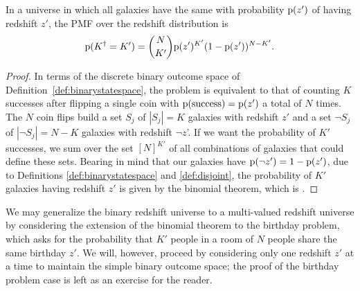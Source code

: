 \begin{lemma}\label{lem:identical}
	In a universe in which all galaxies have the same \pzpdf with probability $\mathrm{p}(z')$ of having redshift $z'$, the PMF over the redshift distribution is
	\begin{equation}
	\eqlabel{eqn:binomial}
	\pr{K^{\dagger} = K'} = \binom{N}{K'} \pr{z'}^{K'} (1 - \pr{z'})^{N - K'} .
	\end{equation}
\end{lemma}
\begin{proof}
In terms of the discrete binary outcome space of Definition~\ref{def:binarystatespace}, the problem is equivalent to that of counting $K$ successes after flipping a single coin with $\mathrm{p}(\mathrm{success}) = \mathrm{p}(z')$ a total of $N$ times.
The $N$ coin flips build a set $S_{j}$ of ${|S_{j}| = K}$ galaxies with redshift $z'$ and a set $\lnot S_{j}$ of ${|\lnot S_{j}| = N - K}$ galaxies with redshift $\lnot z$'.
If we want the probability of $K'$ successes, we sum over the set $[N]^{K'}$ of all combinations of galaxies that could define these sets.
Bearing in mind that our galaxies have ${\mathrm{p}(\lnot z') = 1 - \mathrm{p}(z')}$, due to Definitions \ref{def:binarystatespace} and \ref{def:disjoint}, the probability of $K'$ galaxies having redshift $z'$ is given by the binomial theorem, which is .
\end{proof}

We may generalize the binary redshift universe to a multi-valued redshift universe by considering the extension of the binomial theorem to the birthday problem, which asks for the probability that $K'$ people in a room of $N$ people share the same birthday $z'$.
We will, however, proceed by considering only one redshift $z'$ at a time to maintain the simple binary outcome space; 
the proof of the birthday problem case is left as an exercise for the reader.

